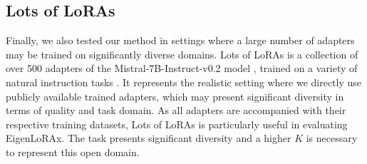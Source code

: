 \begin{table*}[!htb]
    \caption{\small{Results for Lots of LoRAs. We report the Rouge-L scores for each of the 5 tasks from the training set and 5 from the testing set. EigenLoRAx achieves on average \textbf{88\%} of LoRA's performance while requiring anywhere from \textbf{$12\times$} to \textbf{$95\times$} less parameters in a zero-shot setting.
}}  
    \begin{center}
    \begin{sc}
    \label{tab:lola}
    \end{sc}
    \end{center}
\end{table*}
\subsection{Lots of LoRAs}
\label{sec:lotsofloras}
Finally, we also tested our method in settings where a large number of adapters may be trained on significantly diverse domains. Lots of LoRAs \citep{brüelgabrielsson2024compressserveservingthousands} is a collection of over 500 adapters of the Mistral-7B-Instruct-v0.2 model \citep{jiang2023mistral7b}, trained on a variety of natural instruction tasks \citep{wang-etal-2022-super}. It represents the realistic setting where we directly use publicly available trained adapters, which may present significant diversity in terms of quality and task domain. As all adapters are accompanied with their respective training datasets, Lots of LoRAs is particularly useful in evaluating EigenLoRAx. The task presents significant diversity and a higher $K$ is necessary to represent this open domain. 

